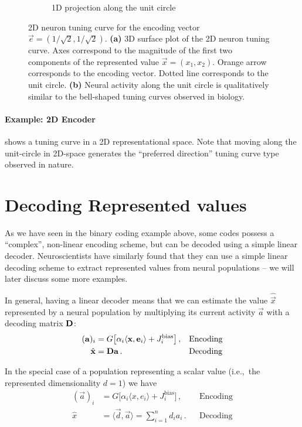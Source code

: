 \documentclass[10pt,letterpaper,oneside]{article}
\begin{document}
\begin{figure}
\begin{subfigure}{0.5\textwidth}
		\caption{1D projection along the unit circle}
		\label{fig:2d_encoder_tuning_curve_unit}
	\end{subfigure}
	\caption{2D neuron tuning curve for the encoding vector $\vec e = (1/\sqrt{2}, 1/\sqrt{2})$. \textbf{(a)} 3D surface plot of the 2D neuron tuning curve. Axes correspond to the magnitude of the first two components of the represented value $\vec x = (x_1, x_2)$. Orange arrow corresponds to the encoding vector. Dotted line corresponds to the unit circle. \textbf{(b)} Neural activity along the unit circle is qualitatively similar to the bell-shaped tuning curves observed in biology. }
\end{figure}

\paragraph{Example: 2D Encoder}
 shows a tuning curve in a 2D representational space. Note that moving along the unit-circle in 2D-space generates the \enquote{preferred direction} tuning curve type observed in nature.

\section{Decoding Represented values}

As we have seen in the binary coding example above, some codes possess a \enquote{complex}, non-linear encoding scheme, but can be decoded using a simple linear decoder. Neuroscientists have similarly found that they can use a simple linear decoding scheme to extract represented values from neural populations -- we will later discuss some more examples.

In general, having a linear decoder means that we can estimate the value $\hat{\vec x}$ represented by a neural population by multiplying its current activity $\vec a$ with a decoding matrix ${\mathbf{D}}$:
\begin{align*}
	({\mathbf{a}})_i &=
		G\big[\alpha_i \langle {\mathbf{x}}, {\mathbf{e}}_i \rangle + J^\mathrm{bias}_i\big] \,, && \text{Encoding} \\
	\hat{{\mathbf{x}}} &= {\mathbf{D}} {\mathbf{a}} \,. && \text{Decoding}
\end{align*}

In the special case of a population representing a scalar value (i.e.,~the represented dimensionality $d = 1$) we have
\begin{align*}
(\vec a)_i &=
G\big[\alpha_i \langle x, e_i \rangle + J^\mathrm{bias}_i\big] \,, && \text{Encoding} \\
\hat{x} &= \langle \vec d, \vec a \rangle = \sum_{i = 1}^n d_i a_i \,. && \text{Decoding}
\end{align*}
\end{document}
